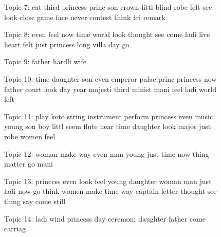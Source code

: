\documentclass[12pt]{article}
\begin{document}
\begin{flushleft}
\begin{spacing}{2.0}
\begin{figure}
Topic 7: cat third princess princ son crown littl blind robe felt see look close game face never contest think tri remark 

Topic 8: even feel now time world look thought see come ladi live heart felt just princess long villa day go 

Topic 9: father hardli wife 

Topic 10: time daughter son even emperor palac princ princess now father court look day year majesti third minist mani feel ladi world left 

Topic 11: play koto string instrument perform princess even music young son boy littl seem flute hear time daughter look major just robe women feel 

Topic 12: woman make way even man young just time now thing matter go mani 

Topic 13: princess even look feel young daughter woman man just ladi now go think women make time way captain letter thought see thing say come still 

Topic 14: ladi wind princess day ceremoni daughter father come carriag 
\end{figure}


\end{spacing}
\end{flushleft}
\end{document}
